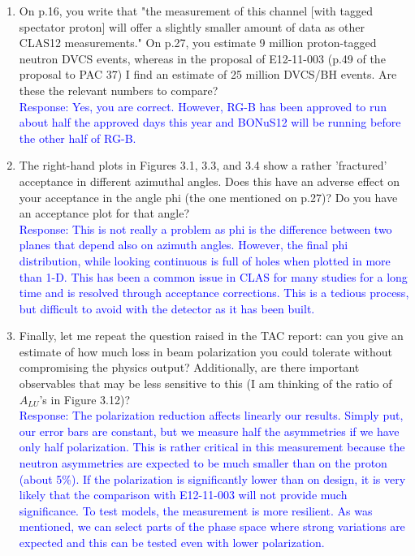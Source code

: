 \documentclass[a4paper,11pt,twoside]{article}
\begin{document}
\begin{enumerate}
\item On p.16, you write that "the measurement of this channel [with tagged
spectator proton] will offer a slightly smaller amount of data as other CLAS12
measurements."  On p.27, you estimate 9 million proton-tagged neutron DVCS
events, whereas in the proposal of E12-11-003 (p.49 of the proposal to PAC 37)
I find an estimate of 25 million DVCS/BH events.  Are these the relevant
numbers to compare?\\

\textcolor{blue}{Response: Yes, you are correct. However, RG-B has been 
approved to run about half the approved days this year and BONuS12 will be 
running before the other half of RG-B. }\\

\item The right-hand plots in Figures 3.1, 3.3, and 3.4 show a rather 
   'fractured' acceptance in different azimuthal angles.  Does this have an 
   adverse effect on your acceptance in the angle phi (the one mentioned on 
   p.27)?  Do you have an acceptance plot for that angle?\\

\textcolor{blue}{Response: This is not really a problem as phi is the difference
between two planes that depend also on azimuth angles. However, the
final phi distribution, while looking continuous is full of holes when
plotted in more than 1-D. This has been a common issue in CLAS for many
studies for a long time and is resolved through acceptance
corrections. This is a tedious process, but difficult to avoid with
the detector as it has been built.}

\item Finally, let me repeat the question raised in the TAC report: can you 
   give an estimate of how much loss in beam polarization you could tolerate 
   without compromising the physics output?  Additionally, are there important
observables that may be less sensitive to this (I am thinking of the ratio of
$A_{LU}$'s in Figure 3.12)?\\

\textcolor{blue}{Response: The polarization reduction affects linearly our results.
Simply put, our error bars are constant, but we measure half the
asymmetries if we have only half polarization. This is rather critical
in this measurement because the neutron asymmetries are expected to be
much smaller than on the proton (about 5\%). If the polarization is
significantly lower than on design, it is very likely that the
comparison with E12-11-003 will not provide much significance. To test
models, the measurement is more resilient. As was mentioned, we can
select parts of the phase space where strong variations are expected
and this can be tested even with lower polarization.}\\



\end{enumerate}
\end{document}
